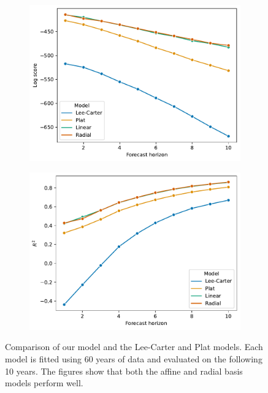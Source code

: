 \documentclass[11pt]{article}
\begin{document}
\begin{figure}
    \centering
    \begin{subfigure}[t]{0.49\textwidth}
        \centering
        \includegraphics[width=\textwidth]{figs/model_comparison_log_score.pdf}
        \caption{}
    \end{subfigure}
    \hfill
    \begin{subfigure}[t]{0.49\textwidth}
        \centering
        \includegraphics[width=\textwidth]{figs/model_comparison_R2.pdf}
        \caption{}
    \end{subfigure}
    \hfill
        \caption{Comparison of our model and the Lee-Carter and Plat models. Each model is fitted using 60 years of data and evaluated on the following 10 years. The figures show that both the affine and radial basis models perform well.}
        \label{fig:model_comparison}
\end{figure}
\newpage
\end{document}

